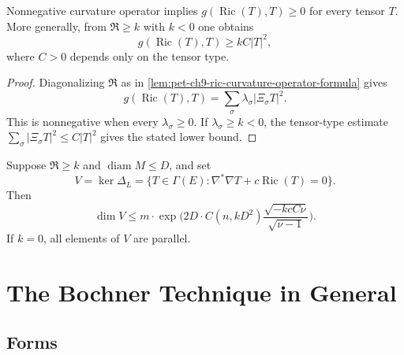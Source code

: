 \begin{corollary}
  \label{cor:pet-ch9-ric-nonneg-curvature-operator}
  Nonnegative curvature operator implies
  $g(\operatorname{Ric}(T),T)\ge0$ for every tensor $T$.  More generally, from
  $\mathfrak R\ge k$ with $k<0$ one obtains
  \[
    g(\operatorname{Ric}(T),T)\ge kC|T|^2,
  \]
  where $C>0$ depends only on the tensor type.
\end{corollary}
\begin{proof}
  \sketch
  Diagonalizing \(\mathfrak R\) as in
  \cref{lem:pet-ch9-ric-curvature-operator-formula} gives
  \[
    g(\operatorname{Ric}(T),T)=\sum_\sigma\lambda_\sigma|\Xi_\sigma T|^2.
  \]
  This is nonnegative when every \(\lambda_\sigma\ge0\).  If
  \(\lambda_\sigma\ge k<0\), the tensor-type estimate
  \(\sum_\sigma|\Xi_\sigma T|^2\le C|T|^2\) gives the stated lower bound.
\end{proof}

\begin{theorem}
  \label{thm:pet-ch9-lichnerowicz-dimension-estimate}
  Suppose $\mathfrak R\ge k$ and $\operatorname{diam}M\le D$, and set
  \[
    V=\ker\Delta_L
      =\{T\in\Gamma(E):\nabla^*\nabla T+c\operatorname{Ric}(T)=0\}.
  \]
  Then
  \[
    \dim V\le
    m\cdot\exp\Big(2D\cdot C(n,kD^2)
      \frac{\sqrt{-kcC\nu}}{\sqrt{\nu-1}}\Big).
  \]
  If $k=0$, all elements of $V$ are parallel.
\end{theorem}

\section{The Bochner Technique in General}

\subsection{Forms}

